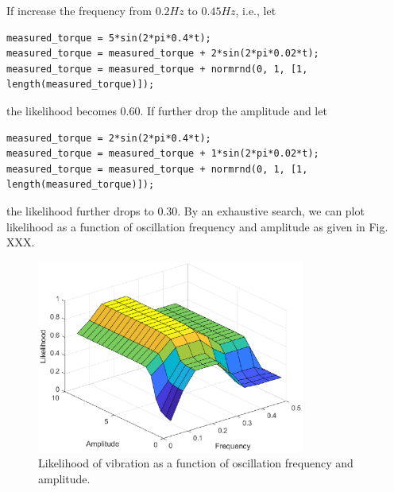 If increase the frequency from $0.2Hz$ to $0.45Hz$, i.e., let 
\begin{lstlisting}
measured_torque = 5*sin(2*pi*0.4*t);
measured_torque = measured_torque + 2*sin(2*pi*0.02*t);
measured_torque = measured_torque + normrnd(0, 1, [1, length(measured_torque)]);
\end{lstlisting}
the likelihood becomes $0.60$. If further drop the amplitude and let
\begin{lstlisting}
measured_torque = 2*sin(2*pi*0.4*t);
measured_torque = measured_torque + 1*sin(2*pi*0.02*t);
measured_torque = measured_torque + normrnd(0, 1, [1, length(measured_torque)]);
\end{lstlisting}
the likelihood further drops to $0.30$. By an exhaustive search, we can plot likelihood as a function of oscillation frequency and amplitude as given in Fig. XXX.

\begin{figure}
	\centering
	\includegraphics[width=250pt]{chapters/ch-fuzzy-control-system/figures/exp_vibration_detection_gensurf1.eps}
	\caption{Likelihood of vibration as a function of oscillation frequency and amplitude.}
	\label{ch:fcs:fig:exp_vibration_detection_gensurf1}
\end{figure}

